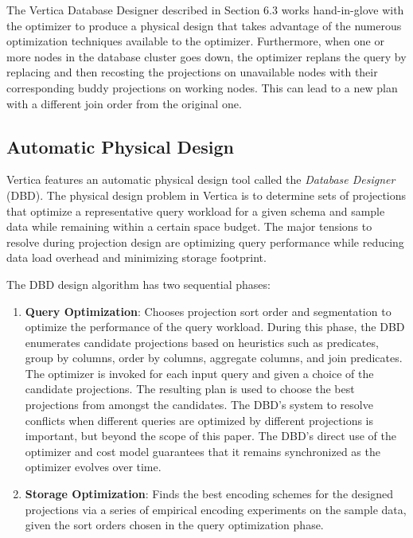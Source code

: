 \documentclass[a4paper,12pt,notitlepage,twoside,openright]{article}
\begin{document}
The Vertica Database Designer described in Section 6.3 works
hand-in-glove with the optimizer to produce a physical design that takes
advantage of the numerous optimization techniques available to the
optimizer. Furthermore, when one or more nodes in the database cluster
goes down, the optimizer replans the query by replacing and then
recosting the projections on unavailable nodes with their corresponding
buddy projections on working nodes. This can lead to a new plan with a
different join order from the original one.

\hypertarget{automatic-physical-design}{%
\subsection{Automatic Physical Design}\label{automatic-physical-design}}

Vertica features an automatic physical design tool called the
\emph{Database Designer} (DBD). The physical design problem in Vertica
is to determine sets of projections that optimize a representative query
workload for a given schema and sample data while remaining within a
certain space budget. The major tensions to resolve during projection
design are optimizing query performance while reducing data load
overhead and minimizing storage footprint.


The DBD design algorithm has two sequential phases:


\begin{enumerate}
\def\labelenumi{\arabic{enumi}.}
\item
  \textbf{Query Optimization}: Chooses projection sort order and
  segmentation to optimize the performance of the query workload. During
  this phase, the DBD enumerates candidate projections based on
  heuristics such as predicates, group by columns, order by columns,
  aggregate columns, and join predicates. The optimizer is invoked for
  each input query and given a choice of the candidate projections. The
  resulting plan is used to choose the best projections from amongst the
  candidates. The DBD's system to resolve conflicts when different
  queries are optimized by different projections is important, but
  beyond the scope of this paper. The DBD's direct use of the optimizer
  and cost model guarantees that it remains synchronized as the
  optimizer evolves over time.
\item
  \textbf{Storage Optimization}: Finds the best encoding schemes for the
  designed projections via a series of empirical encoding experiments on
  the sample data, given the sort orders chosen in the query
  optimization phase.
\end{enumerate}
\end{document}
